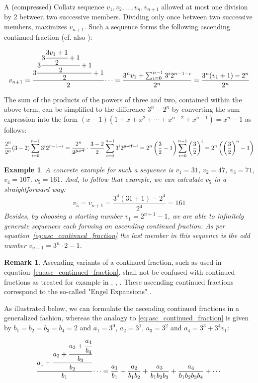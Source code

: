 \documentclass[12pt]{amsart}
\newtheorem{example}[theorem]{Example}
\theoremstyle{definition}
\newtheorem{remark}[theorem]{Remark}
\begin{document}
\par\medskip
A (compressed) Collatz sequence $v_1,v_2,\ldots,v_n,v_{n+1}$ allowed at most one division by $2$ between two successive members. Dividing only once between two successive members, maximizes $v_{n+1}$. Such a sequence forms the following ascending continued fraction (cf. also \cite[p.~11]{Ref_Laarhoven}):

\begin{equation}
\label{eq:asc_continued_fraction}
v_{n+1}=\cfrac{3\cfrac{3\cfrac{3\cfrac{3v_1+1}{2}+1}{2}+1}{2}+1}{2}\dotsb
=\frac{3^nv_1+\sum_{i=0}^{n-1}3^i2^{n-1-i}}{2^n}
=\frac{3^n(v_1+1)-2^n}{2^n}
\end{equation}

\par\medskip
The sum of the products of the powers of three and two, contained within the above term, can be simplified to the difference $3^n-2^n$ by converting the sum expression into the form $(x-1)(1+x+x^2+\cdots+x^{n-2}+x^{n-1})=x^n-1$ as follows:
\[
\frac{2^n}{2^n}(3-2)\sum_{i=0}^{n-1}3^i2^{n-1-i}
=\frac{2^n}{\cancel{2^{n-1}}}\cdot\frac{3-2}{2}\sum_{i=0}^{n-1}3^i2^{\cancel{n-1}-i}
=2^n\left(\frac{3}{2}-1\right)\sum_{i=0}^{n-1}\left(\frac{3}{2}\right)^i
=2^n\left(\left(\frac{3}{2}\right)^n-1\right)
\]

\medskip
\begin{example}
A concrete example for such a sequence is $v_1=31$, $v_2=47$, $v_3=71$, $v_4=107$, $v_5=161$. And, to follow that example, we can calculate $v_5$ in a straightforward way:
\[
v_5=v_{n+1}=\frac{3^4(31+1)-2^4}{2^4}=161
\]
Besides, by choosing a starting number $v_1=2^{n+1}-1$, we are able to infinitely generate sequences each forming an ascending continued fraction. As per equation~\ref{eq:asc_continued_fraction} the last member in this sequence is the odd number $v_{n+1}=3^n\cdot2-1$.
\end{example}

\begin{remark}
	Ascending variants of a continued fraction, such as used in equation~\ref{eq:asc_continued_fraction}, shall not be confused with continued fractions as treated for example in \cite{Ref_Moore}, \cite{Ref_Hensley}, \cite{Ref_Borwe_etal}. These ascending continued fractions correspond to the so-called "Engel Expansions" \cite{Ref_Kraaikamp_Wu}.
\end{remark}

\par\noindent
As illustrated below, we can formulate the ascending continued fractions in a generalized fashion, whereas the analogy to \ref{eq:asc_continued_fraction} is given by $b_1=b_2=b_3=b_4=2$ and $a_1=3^0$, $a_2=3^1$, $a_3=3^2$ and $a_4=3^3+3^4v_1$:
\[
\cfrac{a_1+\cfrac{a_2+\cfrac{a_3+\cfrac{a_4}{b_4}}{b_3}}{b_2}}{b_1}\dotsb=\frac{a_1}{b_1}+\frac{a_2}{b_1b_2}+\frac{a_3}{b_1b_2b_3}+\frac{a_4}{b_1b_2b_3b_4}+\cdots
\]
\end{document}
